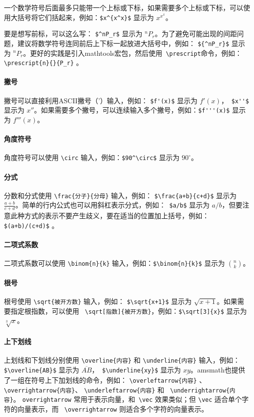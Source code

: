 一个数学符号后面最多只能带一个上标或下标，如果需要多个上标或下标，可以使用大括号将它们括起来，例如：\verb|$x^{x^x}$| 显示为 \(x^{x^x}\)。

要是想写前标，可以这么写： \verb|$^nP_r$| 显示为 \({}^nP_r\)。为了避免可能出现的间距问题，建议将数学符号连同前后上下标一起放进大括号中，例如： \verb|${^nP_r}$| 显示为 \({^nP_r}\)。更好的实践是引入mathtools宏包，然后使用\verb| \prescript|命令，例如： \verb|\prescript{n}{}{P_r}| 。

\paragraph{撇号} 撇号可以直接利用ASCII撇号（'）输入，例如： \verb|$f'(x)$| 显示为 \(f'(x)\)，\verb| $x''$| 显示为 \(x''\)。如果需要多个撇号，可以连续输入多个撇号，例如：\verb|$f'''(x)$| 显示为 \(f'''(x)\)。

\paragraph{角度符号} 角度符号可以使用 \verb|\circ| 输入，例如：\verb|$90^\circ$| 显示为 \(90^\circ\)。

\paragraph{分式} 分数和分式使用 \verb|\frac{分子}{分母}| 输入，例如： \verb|$\frac{a+b}{c+d}$| 显示为 \(\frac{a+b}{c+d}\)。简单的行内公式也可以用斜杠表示分式，例如：\verb| $a/b$| 显示为 \(a/b\)，但要注意此种方式的表示不要产生歧义，要在适当的位置加上括号，例如： \verb|$(a+b)/(c+d)$| 。

\paragraph{二项式系数} 二项式系数可以使用 \verb|\binom{n}{k}| 输入，例如：\verb|$\binom{n}{k}$| 显示为 \(\binom{n}{k}\)。

\paragraph{根号} 根号使用 \verb|\sqrt{被开方数}| 输入，例如： \verb|$\sqrt{x+1}$| 显示为 \(\sqrt{x+1}\)。如果需要指定根指数，可以使用 \verb| \sqrt[指数]{被开方数}|，例如：\verb|$\sqrt[3]{x}$| 显示为 \(\sqrt[3]{x}\)。

\paragraph{上下划线} 上划线和下划线分别使用 \verb|\overline{内容}| 和 \verb|\underline{内容}| 输入，例如： \verb|$\overline{AB}$| 显示为 \(\overline{AB}\)，\verb| $\underline{xy}$| 显示为 \(\underline{xy}\)。amsmath也提供了一组在符号上下加划线的命令，例如： \verb|\overleftarrow{内容}| 、\verb|\overrightarrow{内容}|、 \verb|\underleftarrow{内容}| 和 \verb| \underrightarrow{内容}|。 \verb|overrightarrow| 常用于表示向量，和\verb| \vec| 效果类似；但 \verb|\vec| 适合单个字符的向量表示，而 \verb| \overrightarrow| 则适合多个字符的向量表示。

